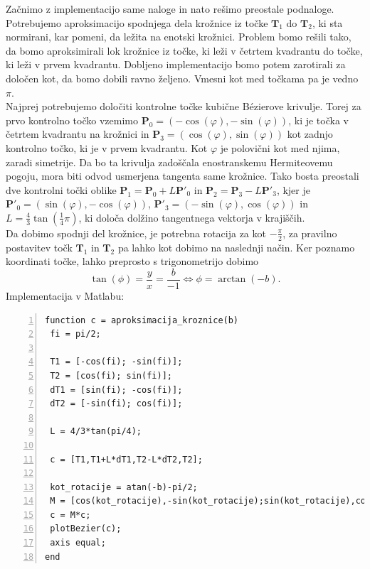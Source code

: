 \documentclass[a4paper,12pt]{article}
\begin{document}
	Začnimo z implementacijo same naloge in nato rešimo preostale podnaloge.
	Potrebujemo aproksimacijo spodnjega dela krožnice iz točke $\boldsymbol{T}_1$ do $\boldsymbol{T}_2$, ki sta normirani, kar pomeni, da ležita na enotski krožnici.
	Problem bomo rešili tako, da bomo aproksimirali lok krožnice iz točke, ki leži v četrtem kvadrantu do točke, ki leži v prvem kvadrantu. 
	Dobljeno implementacijo bomo potem zarotirali za določen kot, da bomo dobili ravno željeno. Vmesni kot med točkama pa je vedno $\pi$.
	\\
	Najprej potrebujemo določiti kontrolne točke kubične B\'{e}zierove krivulje. Torej za prvo kontrolno točko vzemimo $\boldsymbol{P}_0 = (-\cos(\varphi), -\sin(\varphi))$, 
	ki je točka v četrtem kvadrantu na krožnici in 
	$\boldsymbol{P}_3 = (\cos(\varphi), \sin(\varphi))$ kot zadnjo kontrolno točko, ki je v prvem kvadrantu. Kot $\varphi$ je polovični kot med njima, zaradi simetrije.
	Da bo ta krivulja zadoščala enostranskemu Hermiteovemu pogoju, mora biti odvod usmerjena tangenta same krožnice.
	Tako bosta preostali dve kontrolni točki oblike $\boldsymbol{P}_1 = \boldsymbol{P}_0 + L\boldsymbol{P}'_0$ in $\boldsymbol{P}_2 = \boldsymbol{P}_3 - L\boldsymbol{P}'_3$, kjer je $\boldsymbol{P}'_0 = (\sin(\varphi), -\cos(\varphi))$, $\boldsymbol{P}'_3 = (-\sin(\varphi), \cos(\varphi))$ in
	$L = \frac{4}{3} \tan(\frac{1}{4}\pi)$, ki določa dolžino tangentnega vektorja v krajiščih.
	\\
	Da dobimo spodnji del krožnice, je potrebna rotacija za kot $-\frac{\pi}{2}$, za pravilno postavitev 
	točk $\boldsymbol{T}_1$ in $\boldsymbol{T}_2$ pa lahko kot dobimo na naslednji način. Ker poznamo koordinati točke, lahko preprosto s trigonometrijo dobimo
	$$\tan(\phi) = \frac{y}{x} = \frac{b}{-1} \Leftrightarrow \phi = \arctan(-b).$$
	Implementacija v Matlabu:
	
	\begin{lstlisting}[style=Matlab-editor,	numbers=left,]
function c = aproksimacija_kroznice(b)
 fi = pi/2;
		
 T1 = [-cos(fi); -sin(fi)];
 T2 = [cos(fi); sin(fi)];
 dT1 = [sin(fi); -cos(fi)];
 dT2 = [-sin(fi); cos(fi)];
		
 L = 4/3*tan(pi/4);
		
 c = [T1,T1+L*dT1,T2-L*dT2,T2];
		
 kot_rotacije = atan(-b)-pi/2;
 M = [cos(kot_rotacije),-sin(kot_rotacije);sin(kot_rotacije),cos(kot_rotacije)];
 c = M*c;
 plotBezier(c); 
 axis equal;
end
	\end{lstlisting}
	
\end{document}
